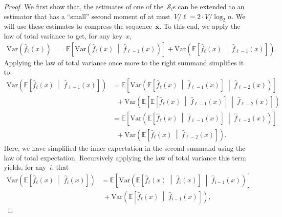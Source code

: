 \documentclass[sigconf]{acmart}
\begin{document}
\begin{proof}
    We first show that, the estimates of one of the~$\mathcal{S}_i$s can be
    extended to an estimator that has a ``small'' second moment of at
    most~$V/\ell = 2 \cdot V/\log_2 n$. We will use these estimates to
    compress the sequence~$\mathbf{x}$. To this end, we apply the law of total
    variance to get, for any key~$x$,
    \begin{align*}
        \mathrm{Var} \left( \hat{f}_\ell(x) \right) & = \mathbb{E}\left[ \mathrm{Var}\left( \hat{f}_{\ell}(x) \;\middle|\; \hat{f}_{\ell - 1}(x) \right) \right]
                                                      + \mathrm{Var}\left( \mathbb{E}\left[ \hat{f}_{\ell}(x) \;\middle|\; \hat{f}_{\ell - 1}(x) \right] \right).
    \end{align*}
    Applying the law of total variance once more to the right summand
    simplifies it to
    \begin{align*}
        \mathrm{Var}\left( \mathbb{E}\left[ \hat{f}_\ell(x) \;\middle|\; \hat{f}_{\ell - 1}(x) \right] \right) & = \mathbb{E}\left[ \mathrm{Var}\left( \mathbb{E}\left[ \hat{f}_{\ell}(x) \;\middle|\; \hat{f}_{\ell - 1}(x) \right] \;\middle|\; \hat{f}_{\ell - 2}(x) \right) \right] \\
                                                      & \; \; + \mathrm{Var}\left( \mathbb{E}\left[ \mathbb{E}\left[ \hat{f}_{\ell}(x) \;\middle|\; \hat{f}_{\ell - 1}(x) \right] \;\middle|\; \hat{f}_{\ell - 2}(x) \right] \right) \\
                                                      & = \mathbb{E}\left[ \mathrm{Var}\left( \mathbb{E}\left[ \hat{f}_{\ell}(x) \;\middle|\; \hat{f}_{\ell - 1}(x) \right] \;\middle|\; \hat{f}_{\ell - 2}(x) \right) \right] \\
                                                      & \; \; + \mathrm{Var}\left( \mathbb{E}\left[ \hat{f}_\ell(x) \;\middle|\; \hat{f}_{\ell - 2}(x) \right] \right).
    \end{align*}
    Here, we have simplified the inner expectation in the second summand using
    the law of total expectation. Recursively applying the law of total
    variance this term yields, for any~$i$, that
    \begin{align*}
        \mathrm{Var}\left( \mathbb{E}\left[ \hat{f}_\ell(x) \;\middle|\; \hat{f}_i(x) \right] \right) & = \mathbb{E}\left[ \mathrm{Var}\left( \mathbb{E}\left[ \hat{f}_{\ell}(x) \;\middle|\; \hat{f}_i(x) \right] \;\middle|\; \hat{f}_{i - 1}(x) \right) \right] \\
                                                      & \; + \mathrm{Var}\left( \mathbb{E}\left[ \hat{f}_\ell(x) \;\middle|\; \hat{f}_{i - 1}(x) \right] \right),

\end{align*}
\end{proof}
\end{document}
